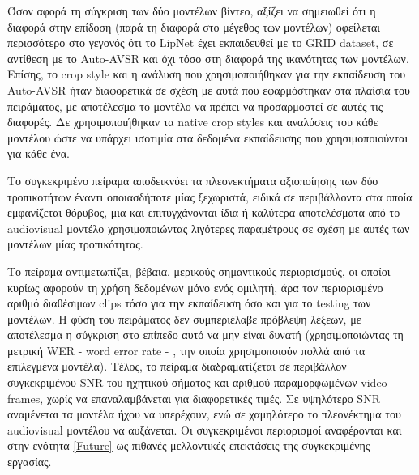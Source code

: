 Όσον αφορά τη σύγκριση των δύο μοντέλων βίντεο, αξίζει να σημειωθεί ότι η διαφορά στην επίδοση (παρά τη διαφορά στο μέγεθος των μοντέλων) οφείλεται περισσότερο στο γεγονός ότι το LipNet έχει εκπαιδευθεί με το GRID dataset, σε αντίθεση με το Auto-AVSR και όχι τόσο στη διαφορά της ικανότητας των μοντέλων. Επίσης, το crop style και η ανάλυση που χρησιμοποιήθηκαν για την εκπαίδευση του Auto-AVSR ήταν διαφορετικά σε σχέση με αυτά που εφαρμόστηκαν στα πλαίσια του πειράματος, με αποτέλεσμα το μοντέλο να πρέπει να προσαρμοστεί σε αυτές τις διαφορές. Δε χρησιμοποιήθηκαν τα native crop styles και αναλύσεις του κάθε μοντέλου ώστε να υπάρχει ισοτιμία στα δεδομένα εκπαίδευσης που χρησιμοποιούνται για κάθε ένα.

Το συγκεκριμένο πείραμα αποδεικνύει τα πλεονεκτήματα αξιοποίησης των δύο τροπικοτήτων έναντι οποιασδήποτε μίας ξεχωριστά, ειδικά σε περιβάλλοντα στα οποία εμφανίζεται θόρυβος, μια και επιτυγχάνονται ίδια ή καλύτερα αποτελέσματα από το audiovisual μοντέλο χρησιμοποιώντας λιγότερες παραμέτρους σε σχέση με αυτές των μοντέλων μίας τροπικότητας. 

Το πείραμα αντιμετωπίζει, βέβαια, μερικούς σημαντικούς περιορισμούς, οι οποίοι κυρίως αφορούν τη χρήση δεδομένων μόνο ενός ομιλητή, άρα τον περιορισμένο αριθμό διαθέσιμων clips τόσο για την εκπαίδευση όσο και για το testing των μοντέλων. Η φύση του πειράματος δεν συμπεριέλαβε πρόβλεψη λέξεων, με αποτέλεσμα η σύγκριση στο επίπεδο αυτό να μην είναι δυνατή (χρησιμοποιώντας τη μετρική WER - word error rate - , την οποία χρησιμοποιούν πολλά από τα επιλεγμένα μοντέλα). Τέλος, το πείραμα διαδραματίζεται σε περιβάλλον συγκεκριμένου SNR του ηχητικού σήματος και αριθμού παραμορφωμένων video frames, χωρίς να επαναλαμβάνεται για διαφορετικές τιμές. Σε υψηλότερο SNR αναμένεται τα μοντέλα ήχου να υπερέχουν, ενώ σε χαμηλότερο το πλεονέκτημα του audiovisual μοντέλου να αυξάνεται. Οι συγκεκριμένοι περιορισμοί αναφέρονται και στην ενότητα \ref{Future} ως πιθανές μελλοντικές επεκτάσεις της συγκεκριμένης εργασίας.


